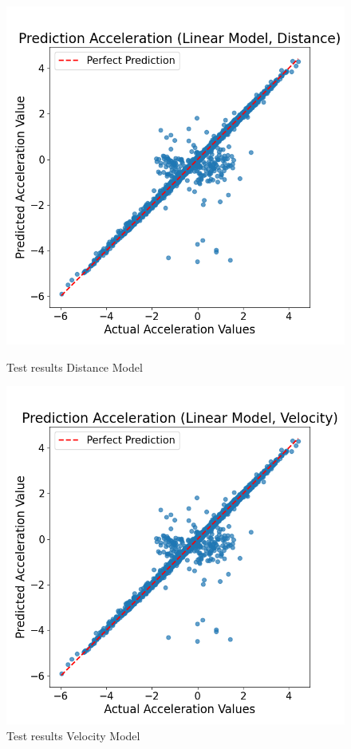 \begin{figure}[h]
    \centering
    \begin{minipage}[b]{0.45\columnwidth}
        \centering
        \includegraphics[width=\columnwidth]{images/figures/Prediction Acceleration (Linear Model, Distance).png}
        \caption{Test results Distance Model}
        \label{fig:minipage3}
    \end{minipage}
    \hfill
    \begin{minipage}[b]{0.45\columnwidth}
        \centering
        \includegraphics[width=\columnwidth]{images/figures/Prediction Acceleration (Linear Model, Velocity).png}
        \caption{Test results Velocity Model}
        \label{fig:minipage4}
    \end{minipage}
\end{figure}

